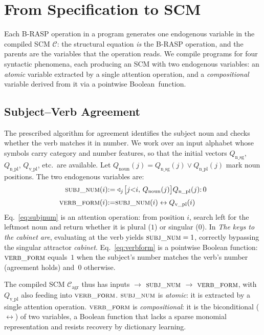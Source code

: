 \documentclass[11pt]{article}
\begin{document}
\section{From Specification to SCM}
\label{sec:spec-to-scm}

Each B-RASP operation in a program generates one endogenous variable in the compiled SCM $\mathcal{C}$: the structural equation \emph{is} the B-RASP operation, and the parents are the variables that the operation reads.
We compile programs for four syntactic phenomena, each producing an SCM with two endogenous variables: an \emph{atomic} variable extracted by a single attention operation, and a \emph{compositional} variable derived from it via a pointwise Boolean~\mbox{function}.

\subsection{Subject--Verb Agreement}
\label{sec:agreement}

The prescribed algorithm for agreement identifies the subject noun and checks whether the verb matches it in number.
We work over an input alphabet whose symbols carry category and number features, so that the initial vectors $Q_\text{n\_sg}$, $Q_\text{n\_pl}$, $Q_\text{v\_pl}$, etc.\ are available.
Let $Q_\text{noun}(j) = Q_\text{n\_sg}(j) \lor Q_\text{n\_pl}(j)$ mark noun positions.
The two endogenous variables are:
%
\begin{align}
\textsc{subj\_num}(i) &{:=} \triangleleft_j\!\bigl[j{<}i,\,Q_\text{noun}(j)\bigr] Q_\text{n\_pl}(j) {:}\, 0 \label{eq:subjnum}\\[3pt]
\textsc{verb\_form}(i) &{:=} \textsc{subj\_num}(i) \leftrightarrow Q_\text{v\_pl}(i) \label{eq:verbform}
\end{align}
%
Eq.~\ref{eq:subjnum} is an attention operation: from position $i$, search left for the leftmost noun and return whether it is plural ($1$) or singular ($0$).
In \textit{The keys to the cabinet are}, evaluating at the verb yields $\textsc{subj\_num} = 1$, correctly bypassing the singular attractor \textit{cabinet}.
Eq.~\ref{eq:verbform} is a pointwise Boolean function: $\textsc{verb\_form}$ equals~$1$ when the subject's number matches the verb's number (agreement holds) and~$0$ otherwise.

The compiled SCM $\mathcal{C}_\text{agr}$ thus has inputs $\to$ $\textsc{subj\_num}$ $\to$ $\textsc{verb\_form}$, with $Q_\text{v\_pl}$ also feeding into $\textsc{verb\_form}$.
$\textsc{subj\_num}$ is \emph{atomic}: it is extracted by a single attention operation.
$\textsc{verb\_form}$ is \emph{compositional}: it is the biconditional ($\leftrightarrow$) of two variables, a Boolean function that lacks a sparse monomial representation and resists recovery by dictionary learning.
\end{document}
